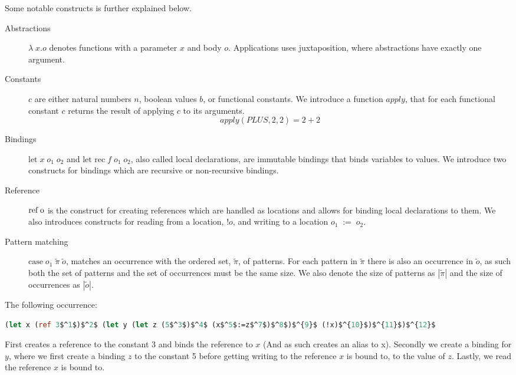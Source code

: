 \documentclass[../../master.tex]{subfiles}
\begin{document}
Some notable constructs is further explained below.
\begin{description}
	\item[Abstractions] $\lambda\;x.o$ denotes functions with a parameter $x$ and body $o$.
		Applications uses juxtaposition, where abstractions have exactly one argument.

	\item[Constants] $c$ are either natural numbers $n$, boolean values $b$, or functional constants.
		We introduce a function $apply$, that for each functional constant $c$ returns the result of applying $c$ to its arguments.
		$$apply(PLUS,2,2)=2+2$$

	\item[Bindings] $\mbox{let} \; x \; o_1 \; o_2$ and $\mbox{let rec} \; f \; o_1 \; o_2$, also called local declarations, are immutable bindings that binds variables to values.
		We introduce two constructs for bindings which are recursive or non-recursive bindings.

	\item[Reference] $\mbox{ref\;o}$ is the construct for creating references which are handled as locations and allows for binding local declarations to them.
		We also introduces constructs for reading from a location, $!o$, and writing to a location $o_1\;:=\;o_2$.

	\item[Pattern matching] $\mbox{case} \; o_1 \; \tilde{\pi} \; \tilde{o}$, matches an occurrence with the ordered set, $\tilde{\pi}$, of patterns.
		For each pattern in $\tilde{\pi}$ there is also an occurrence in $\tilde{o}$, as such both the set of patterns and the set of occurrences must be the same size.
		We also denote the size of patterns as $|\tilde{\pi}|$ and the size of occurrences as $|\tilde{o}|$.
\end{description}

\begin{example}[]\label{ex:write}
The following occurrence:
\begin{lstlisting}[language=Caml, mathescape=true]
(let x (ref 3$^1$)$^2$ (let y (let z (5$^3$)$^4$ (x$^5$:=z$^7$)$^8$)$^{9}$ (!x)$^{10}$)$^{11}$)$^{12}$
\end{lstlisting}
First creates a reference to the constant 3 and binds the reference to $x$ (And as such creates an alias to x).
Secondly we create a binding for $y$, where we first create a binding $z$ to the constant 5 before getting writing to the reference $x$ is bound to, to the value of $z$.
Lastly, we read the reference $x$ is bound to.
\end{example}
\end{document}
